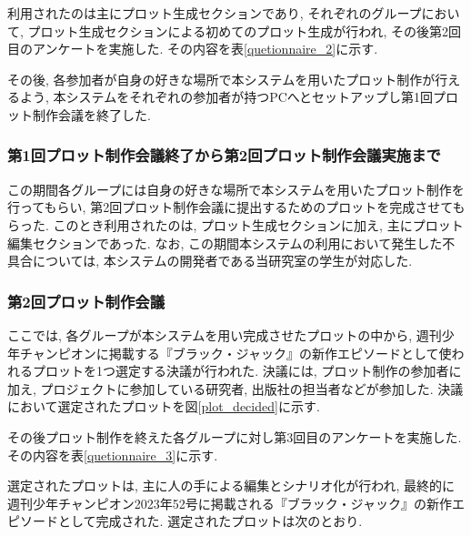 \documentclass[a4j,12pt]{jsreport}
\begin{document}
利用されたのは主にプロット生成セクションであり, それぞれのグループにおいて, プロット生成セクションによる初めてのプロット生成が行われ, その後第2回目のアンケートを実施した. その内容を表\ref{quetionnaire_2}に示す.

その後, 各参加者が自身の好きな場所で本システムを用いたプロット制作が行えるよう, 本システムをそれぞれの参加者が持つPCへとセットアップし第1回プロット制作会議を終了した.

\subsubsection{第1回プロット制作会議終了から第2回プロット制作会議実施まで}
この期間各グループには自身の好きな場所で本システムを用いたプロット制作を行ってもらい, 第2回プロット制作会議に提出するためのプロットを完成させてもらった. このとき利用されたのは, プロット生成セクションに加え, 主にプロット編集セクションであった. なお, この期間本システムの利用において発生した不具合については, 本システムの開発者である当研究室の学生が対応した. 

\subsubsection{第2回プロット制作会議}
ここでは, 各グループが本システムを用い完成させたプロットの中から, 週刊少年チャンピオンに掲載する『ブラック・ジャック』の新作エピソードとして使われるプロットを1つ選定する決議が行われた. 決議には, プロット制作の参加者に加え, プロジェクトに参加している研究者, 出版社の担当者などが参加した. 決議において選定されたプロットを図\ref{plot_decided}に示す.

その後プロット制作を終えた各グループに対し第3回目のアンケートを実施した. その内容を表\ref{quetionnaire_3}に示す.

選定されたプロットは, 主に人の手による編集とシナリオ化が行われ, 最終的に週刊少年チャンピオン2023年52号に掲載される『ブラック・ジャック』の新作エピソードとして完成された. 選定されたプロットは次のとおり.
\end{document}
